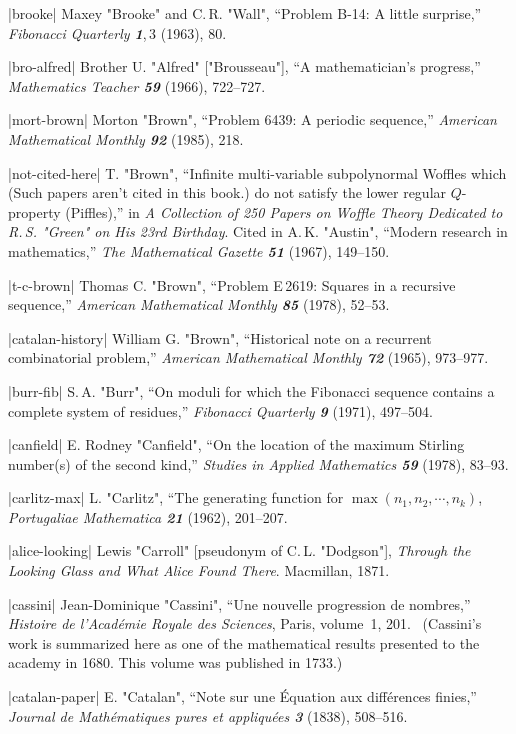 \bib|brooke|%
Maxey "Brooke" and C.\,R. "Wall", ``Problem B-14: A little surprise,''
{\sl Fibonacci Quarterly\/ \bf1},\,3 (1963), 80.

\bib|bro-alfred|%
Brother U. "Alfred" ["Brousseau"], ``A mathematician's progress,''
{\sl Mathematics Teacher\/ \bf59} (1966), 722--727.

\bib|mort-brown|%
Morton "Brown", ``Problem 6439: A periodic sequence,''
{\sl American Mathematical Monthly\/ \bf92} (1985), 218.

\bib|not-cited-here|%
T. "Brown", ``Infinite multi-variable subpolynormal Woffles which
\g \vskip-6pt (Such papers aren't cited in this book.)\g
do not satisfy the lower regular $Q$-property (Piffles),''
in {\sl A Collection of 250 Papers on Woffle Theory Dedicated to
R.\,S. "Green" on His 23rd Birthday}.
Cited in A.\,K. "Austin", ``Modern research in mathematics,''
{\sl The Mathematical Gazette\/ \bf51} (1967), 149--150.

\bib|t-c-brown|%
Thomas C. "Brown", ``Problem E\,2619: Squares in a recursive
sequence,'' {\sl American Mathematical Monthly\/ \bf85} (1978), 52--53.

\bib|catalan-history|%
William G. "Brown", ``Historical note on a recurrent combinatorial problem,''
{\sl American Mathematical Monthly\/ \bf72} (1965), 973--977.

\bib|burr-fib|%
S.\,A. "Burr", ``On moduli for which the Fibonacci sequence contains a complete
system of residues,'' {\sl Fibonacci Quarterly\/ \bf9} (1971), 497--504.

\bib|canfield|%
E. Rodney "Canfield", ``On the location of the maximum Stirling number(s)
of the second kind,'' {\sl Studies in Applied Mathematics\/ \bf59}
(1978), 83--93.

\bib|carlitz-max|%
L. "Carlitz", ``The generating function for $\max(n_1,n_2,\cdots,n_k)$,
{\sl Portugaliae Mathematica\/ \bf 21} (1962), 201--207.

\bib|alice-looking|%
Lewis "Carroll" [pseudonym of C.\,L. "Dodgson"],
 {\sl Through the Looking Glass
and What Alice Found There}. Macmillan, 1871.

\bib|cassini|%
Jean-Dominique "Cassini", ``Une nouvelle progression de nombres,''
{\sl Histoire de l'Acad\'emie Royale des Sciences}, Paris, volume~1, 201.
\ (Cassini's work is summarized here as one of the mathematical results
presented to the academy in 1680. This volume was published in 1733.)

\bib|catalan-paper|%
E. "Catalan", ``Note sur une \'Equation aux diff\'erences finies,''
{\sl Journal de Math\'ematiques pures et appliqu\'ees\/ \bf3}
(1838), 508--516.

